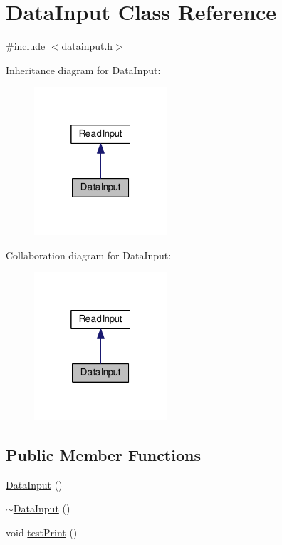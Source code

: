 \hypertarget{class_data_input}{\section{Data\-Input Class Reference}
\label{class_data_input}
}


{\ttfamily \#include $<$datainput.\-h$>$}



Inheritance diagram for Data\-Input\-:\nopagebreak
\begin{figure}[H]
\begin{center}
\leavevmode
\includegraphics[width=140pt]{class_data_input__inherit__graph}
\end{center}
\end{figure}


Collaboration diagram for Data\-Input\-:\nopagebreak
\begin{figure}[H]
\begin{center}
\leavevmode
\includegraphics[width=140pt]{class_data_input__coll__graph}
\end{center}
\end{figure}
\subsection*{Public Member Functions}
\begin{DoxyCompactItemize}
\item 
\hyperlink{class_data_input_af2e87fe631ff367c6ef8fa428f3367c4}{Data\-Input} ()
\item 
\hyperlink{class_data_input_a526be3b7b6daeb510ababe0da5222cca}{$\sim$\-Data\-Input} ()
\item 
void \hyperlink{class_data_input_aab1accef9d6147402c2426300656dd3b}{test\-Print} ()
\end{DoxyCompactItemize}
